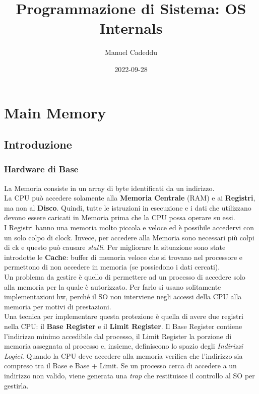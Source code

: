 \documentclass{article}
\title{Programmazione di Sistema: OS Internals}
\date{2022-09-28}
\author{Manuel Cadeddu}
\begin{document}
	\maketitle
	\newpage
	\doublespacing
	\tableofcontents
	\singlespacing
	\newpage
	
	\section{Main Memory}

		\subsection{Introduzione}

			\subsubsection{Hardware di Base}
				La Memoria consiste in un array di byte identificati da un indirizzo.
				\\La CPU può accedere solamente alla \textbf{Memoria Centrale} (RAM) e ai \textbf{Registri}, ma non al \textbf{Disco}. Quindi, tutte le istruzioni in esecuzione e i dati che utilizzano devono essere caricati in Memoria prima che la CPU possa operare su essi.
				\\I Registri hanno una memoria molto piccola e veloce ed è possibile accedervi con un solo colpo di clock. Invece, per accedere alla Memoria sono necessari più colpi di ck e questo può causare \textit{stalli}. Per migliorare la situazione sono state introdotte le \textbf{Cache}: buffer di memoria veloce che si trovano nel processore e permettono di non accedere in memoria (se possiedono i dati cercati).
				\\Un problema da gestire è quello di permettere ad un processo di accedere solo alla memoria per la quale è autorizzato. Per farlo si usano solitamente implementazioni hw, perché il SO non interviene negli accessi della CPU alla memoria per motivi di prestazioni.
				\\Una tecnica per implementare questa protezione è quella di avere due registri nella CPU: il \textbf{Base Register} e il \textbf{Limit Register}. Il Base Register contiene l'indirizzo minimo accedibile dal processo, il Limit Register la porzione di memoria assegnata al processo e, insieme, definiscono lo spazio degli \textit{Indirizzi Logici}. Quando la CPU deve accedere alla memoria verifica che l'indirizzo sia compreso tra il Base e Base + Limit. Se un processo cerca di accedere a un indirizzo non valido, viene generata una \textit{trap} che restituisce il controllo al SO per gestirla.
\end{document}

